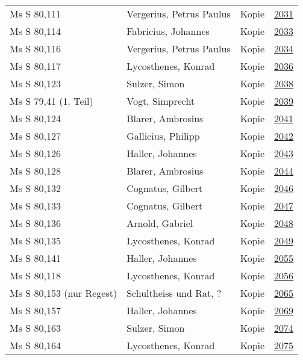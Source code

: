 \documentclass[10pt,a4paper,landscape]{report}
\begin{document}
\begin{longtable}{p{16cm}p{4cm}lr}
Ms S 80,111	&	Vergerius, Petrus Paulus	&	Kopie	&	\href{http://130.60.24.72/assignment/2031}{2031}\\
Ms S 80,114	&	Fabricius, Johannes	&	Kopie	&	\href{http://130.60.24.72/assignment/2033}{2033}\\
Ms S 80,116	&	Vergerius, Petrus Paulus	&	Kopie	&	\href{http://130.60.24.72/assignment/2034}{2034}\\
Ms S 80,117	&	Lycosthenes, Konrad	&	Kopie	&	\href{http://130.60.24.72/assignment/2036}{2036}\\
Ms S 80,123	&	Sulzer, Simon	&	Kopie	&	\href{http://130.60.24.72/assignment/2038}{2038}\\
Ms S 79,41 (1. Teil)	&	Vogt, Simprecht	&	Kopie	&	\href{http://130.60.24.72/assignment/2039}{2039}\\
Ms S 80,124	&	Blarer, Ambrosius	&	Kopie	&	\href{http://130.60.24.72/assignment/2041}{2041}\\
Ms S 80,127	&	Gallicius, Philipp	&	Kopie	&	\href{http://130.60.24.72/assignment/2042}{2042}\\
Ms S 80,126	&	Haller, Johannes	&	Kopie	&	\href{http://130.60.24.72/assignment/2043}{2043}\\
Ms S 80,128	&	Blarer, Ambrosius	&	Kopie	&	\href{http://130.60.24.72/assignment/2044}{2044}\\
Ms S 80,132	&	Cognatus, Gilbert	&	Kopie	&	\href{http://130.60.24.72/assignment/2046}{2046}\\
Ms S 80,133	&	Cognatus, Gilbert	&	Kopie	&	\href{http://130.60.24.72/assignment/2047}{2047}\\
Ms S 80,136	&	Arnold, Gabriel	&	Kopie	&	\href{http://130.60.24.72/assignment/2048}{2048}\\
Ms S 80,135	&	Lycosthenes, Konrad	&	Kopie	&	\href{http://130.60.24.72/assignment/2049}{2049}\\
Ms S 80,141	&	Haller, Johannes	&	Kopie	&	\href{http://130.60.24.72/assignment/2055}{2055}\\
Ms S 80,118	&	Lycosthenes, Konrad	&	Kopie	&	\href{http://130.60.24.72/assignment/2056}{2056}\\
Ms S 80,153 (nur Regest)	&	Schultheiss und Rat, ?	&	Kopie	&	\href{http://130.60.24.72/assignment/2065}{2065}\\
Ms S 80,157	&	Haller, Johannes	&	Kopie	&	\href{http://130.60.24.72/assignment/2069}{2069}\\
Ms S 80,163	&	Sulzer, Simon	&	Kopie	&	\href{http://130.60.24.72/assignment/2074}{2074}\\
Ms S 80,164	&	Lycosthenes, Konrad	&	Kopie	&	\href{http://130.60.24.72/assignment/2075}{2075}\\

\end{longtable}
\end{document}
